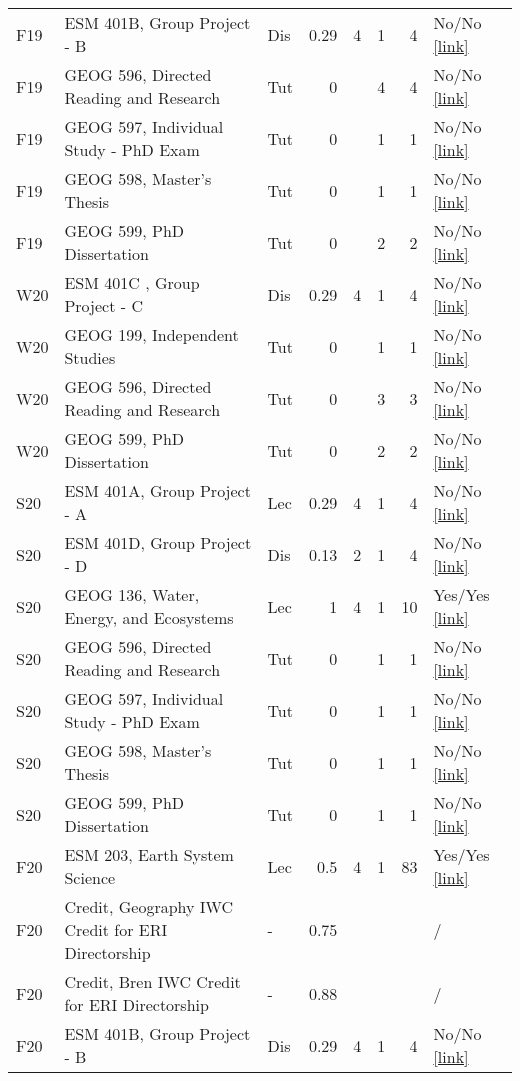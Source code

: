 \begin{longtable}{p{1cm}p{7cm}p{0.75cm}rrrrp{2.5cm}}
F19 & ESM 401B, Group Project - B & Dis & 0.29 & 4 & 1 & 4 & No/No  \href{}{[link]}  \\ 
F19 & GEOG 596, Directed Reading and Research & Tut & 0 &  & 4 & 4 & No/No  \href{}{[link]}  \\ 
F19 & GEOG 597, Individual Study - PhD Exam & Tut & 0 &  & 1 & 1 & No/No  \href{}{[link]}  \\ 
F19 & GEOG 598, Master’s Thesis & Tut & 0 &  & 1 & 1 & No/No  \href{}{[link]}  \\ 
F19 & GEOG 599, PhD Dissertation & Tut & 0 &  & 2 & 2 & No/No  \href{}{[link]}  \\ 
W20 & ESM 401C , Group Project - C & Dis & 0.29 & 4 & 1 & 4 & No/No  \href{}{[link]}  \\ 
W20 & GEOG 199, Independent Studies & Tut & 0 &  & 1 & 1 & No/No  \href{}{[link]}  \\ 
W20 & GEOG 596, Directed Reading and Research & Tut & 0 &  & 3 & 3 & No/No  \href{}{[link]}  \\ 
W20 & GEOG 599, PhD Dissertation & Tut & 0 &  & 2 & 2 & No/No  \href{}{[link]}  \\ 
S20 & ESM 401A, Group Project - A & Lec & 0.29 & 4 & 1 & 4 & No/No  \href{}{[link]}  \\ 
S20 & ESM 401D, Group Project - D & Dis & 0.13 & 2 & 1 & 4 & No/No  \href{}{[link]}  \\ 
S20 & GEOG 136, Water, Energy, and Ecosystems & Lec & 1 & 4 & 1 & 10 & Yes/Yes  \href{https://ucsb.box.com/s/4k3squfamwz4gg5mj2q79wo5qk29bubb}{[link]}  \\ 
S20 & GEOG 596, Directed Reading and Research & Tut & 0 &  & 1 & 1 & No/No  \href{}{[link]}  \\ 
S20 & GEOG 597, Individual Study - PhD Exam & Tut & 0 &  & 1 & 1 & No/No  \href{}{[link]}  \\ 
S20 & GEOG 598, Master’s Thesis & Tut & 0 &  & 1 & 1 & No/No  \href{}{[link]}  \\ 
S20 & GEOG 599, PhD Dissertation & Tut & 0 &  & 1 & 1 & No/No  \href{}{[link]}  \\ 
F20 & ESM 203, Earth System Science & Lec & 0.5 & 4 & 1 & 83 & Yes/Yes  \href{https://ucsb.box.com/s/x8g8gcl7mtfahclm1zledaita1z5tgin}{[link]}  \\ 
F20 & Credit, Geography IWC Credit for ERI Directorship & - & 0.75 &  &  &  & /  \\ 
F20 & Credit, Bren IWC Credit for ERI Directorship & - & 0.88 &  &  &  & /  \\ 
F20 & ESM 401B, Group Project - B & Dis & 0.29 & 4 & 1 & 4 & No/No  \href{}{[link]}  \\ 

\end{longtable}
